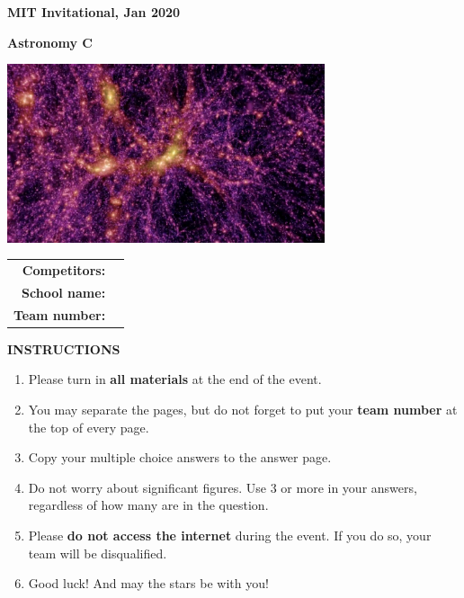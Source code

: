 \documentclass{exam}
\begin{document}
\vspace{.25in}
\begin{center}
	\par\noindent\textbf{\large MIT Invitational, Jan 2020}
\end{center}
\begin{center}
	\par\noindent\textbf{\Huge Astronomy C}
\end{center}
\vspace{.25in}
\begin{center}
	\includegraphics[width=0.7\textwidth]{images/cover.jpg}
\end{center}
\vspace{.25in}
\begin{center}
	\par
	\def\arraystretch{2}\tabcolsep=3pt
	\begin{tabular}{r r}
		\textbf{Competitors:}& \makebox[4in]{\hrulefill} \\
		\textbf{School name:}& \makebox[4in]{\hrulefill} \\
		\textbf{Team number:}& \makebox[4in]{\hrulefill} \\
	\end{tabular}
\end{center}
\vspace{.25in}
\textbf{INSTRUCTIONS}
\begin{enumerate}
    \item Please turn in \textbf{all materials} at the end of the event.
    \item You may separate the pages, but do not forget to put your \textbf{team number} at the top of every
    page.
    \item Copy your multiple choice answers to the answer page.
    \item Do not worry about significant figures. Use 3 or more in your answers, regardless
    of how many are in the question.
    \item Please \textbf{do not access the internet} during the event. If you do so, your team will be
    disqualified.
    \item Good luck! And may the stars be with you!
\end{enumerate}
\end{document}
